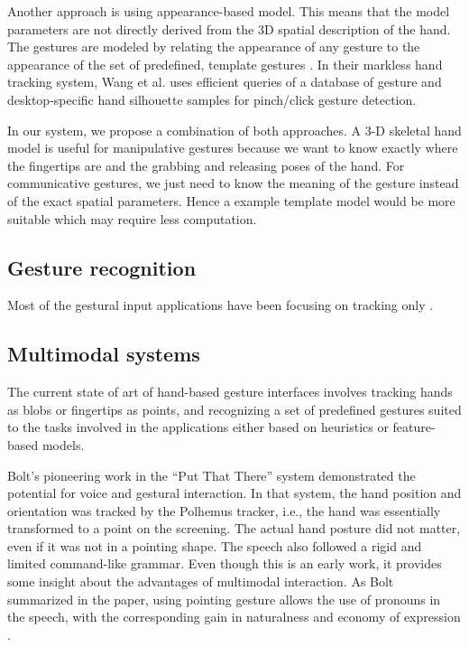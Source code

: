Another approach is using appearance-based model. This means that the model
parameters are not directly derived from the 3D spatial description of the hand.
The gestures are modeled by relating the appearance of any gesture to the 
appearance of the set of predefined, template gestures \cite{Pavlovic97}. In
their markless hand tracking system, Wang et al. \cite{wang11} uses efficient
queries of a database of gesture and desktop-specific hand silhouette samples
for pinch/click gesture detection.

In our system, we propose a combination of both approaches. A 3-D skeletal hand
model is useful for manipulative gestures because we want to know exactly where
the fingertips are and the grabbing and releasing poses of the hand. For
communicative gestures, we just need to know the meaning of the gesture instead
of the exact spatial parameters. Hence a example template model would be more
suitable which may require less computation.

\subsection{Gesture recognition}
Most of the gestural input applications have been focusing on tracking only
\cite{harrison11} \cite{larson11}. 

\subsection{Multimodal systems}
The current state of art of hand-based gesture
interfaces involves tracking hands as blobs or fingertips as points, and recognizing a set of
predefined gestures suited to the tasks involved in the applications
either based on heuristics or feature-based models.

Bolt's pioneering work in the ``Put That There'' system \cite{Bolt80} 
demonstrated the potential for voice and gestural interaction.  In that system, 
the hand position and orientation was tracked by the Polhemus tracker, i.e., the
hand was essentially transformed to a point on the screening. The actual hand 
posture did not matter, even if it was not in a pointing shape. The speech also 
followed a rigid and limited command-like grammar. Even though this is an early 
work, it provides some insight about the advantages of multimodal interaction. 
As Bolt summarized in the paper, using pointing gesture allows the use of 
pronouns in the speech, with the corresponding gain in naturalness and economy 
of expression \cite{Bolt80}.

